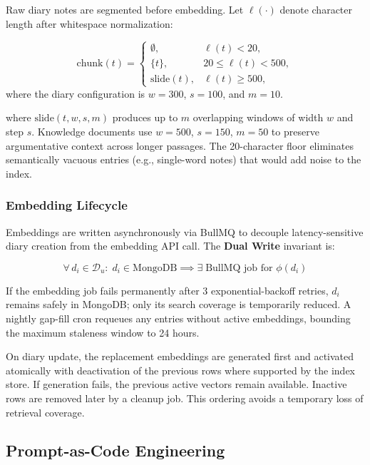 \documentclass[conference]{IEEEtran}
\begin{document}
Raw diary notes are segmented before embedding. Let $\ell(\cdot)$
denote character length after whitespace normalization:

\begin{equation}
\mathrm{chunk}(t)=
\begin{cases}
\emptyset, & \ell(t)<20,\\
\{t\}, & 20\leq\ell(t)<500,\\
\mathrm{slide}(t), & \ell(t)\geq500,
\end{cases}
\label{eq:chunk}
\end{equation}
where the diary configuration is $w=300$, $s=100$, and $m=10$.

\noindent where $\mathrm{slide}(t, w, s, m)$ produces up to $m$
overlapping windows of width $w$ and step $s$. Knowledge documents
use $w{=}500$, $s{=}150$, $m{=}50$ to preserve argumentative context
across longer passages. The 20-character floor eliminates semantically
vacuous entries (e.g., single-word notes) that would add noise to the
index.

\subsubsection{Embedding Lifecycle}
\label{sec:embed}

Embeddings are written asynchronously via BullMQ to decouple
latency-sensitive diary creation from the embedding API call. The
\textbf{Dual Write} invariant is:

\begin{equation}
  \forall\, d_i \in \mathcal{D}_u:\;
  d_i \in \mathrm{MongoDB} \implies
  \exists\;\text{BullMQ job for } \phi(d_i)
\end{equation}

If the embedding job fails permanently after 3 exponential-backoff
retries, $d_i$ remains safely in MongoDB; only its search coverage
is temporarily reduced. A nightly gap-fill cron requeues any entries
without active embeddings, bounding the maximum staleness window to
24 hours.

On diary update, the replacement embeddings are generated first and activated atomically with deactivation of the previous rows where supported by the index store. If generation fails, the previous active vectors remain available. Inactive rows are removed later by a cleanup job. This ordering avoids a temporary loss of retrieval coverage.

\subsection{Prompt-as-Code Engineering}
\end{document}
